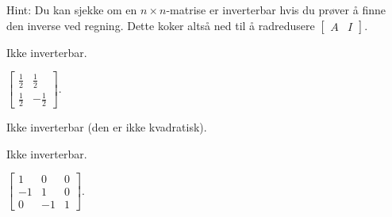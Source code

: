 \begin{losning}
Hint: Du kan sjekke om en $n\times n$-matrise er inverterbar hvis du prøver å finne den inverse ved regning. Dette koker altså ned til å radredusere $\begin{bmatrix}A & I \end{bmatrix}$.

\begin{punkt}
Ikke inverterbar.
\end{punkt}

\begin{punkt}
$\begin{bmatrix}
\frac{1}{2} & \frac{1}{2}\\
\frac{1}{2} & -\frac{1}{2}
\end{bmatrix}.$
\end{punkt}

\begin{punkt}
Ikke inverterbar (den er ikke kvadratisk).
\end{punkt}


\begin{punkt}
Ikke inverterbar.
\end{punkt}


\begin{punkt}
$\begin{bmatrix}
1 & 0 & 0 \\
-1 & 1 & 0 \\
0 & -1 & 1
\end{bmatrix}.$
\end{punkt}


\end{losning}





